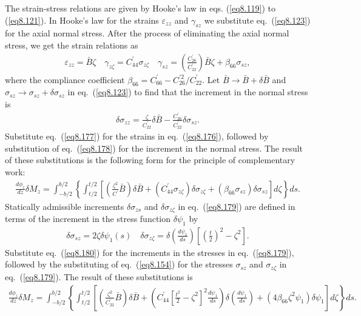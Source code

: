 \documentclass{AeroStructure-ERJohnson}
\begin{document}
\vspace*{-1pc}

The strain-stress relations are given by Hooke's law in eqs.
(\ref{eq8.119}) to (\ref{eq8.121}). In Hooke's law for the strains
$\varepsilon_{z z}$ and $\gamma_{s z}$ we substitute
eq.~(\ref{eq8.123}) for the axial normal stress. After the process
of eliminating the axial normal stress, we get the strain
relations as
\begin{align}\label{eq8.177}
\varepsilon_{z z}=\bar{B} \zeta \quad \gamma_{z \zeta}=C^{\prime}_{44} \sigma_{z \zeta} \quad \gamma_{s
z}=\left(\frac{C^{\prime}_{26}}{C^{\prime}_{22}}\right) \bar{B}
\zeta+\beta_{66} \sigma_{s z},
\end{align}
where the compliance coefficient
$\beta_{66}=C_{66}^{\prime}-C_{26}^{\prime 2}/ C_{22}^{\prime}$.
Let $\bar{B} \rightarrow \bar{B}+\delta \bar{B}$ and $\sigma_{s z}
\rightarrow \sigma_{s z}+\delta \sigma_{s z}$ in
eq.~(\ref{eq8.123}) to find that the increment in the normal
stress is
\begin{align}\label{eq8.178}
\delta \sigma_{z z}=\frac{\zeta}{C_{22}^{\prime}} \delta
\bar{B}-\frac{C_{26}^{\prime}}{C_{22}^{\prime}} \delta \sigma_{s
z}.
\end{align}
Substitute eq.~(\ref{eq8.177}) for the strains in
eq.~(\ref{eq8.176}), followed by substitution of
eq.~(\ref{eq8.178}) for the increment in the normal stress. The
result of these substitutions is the following form for the
principle of complementary work:
\begin{align}\label{eq8.179}
\frac{d \phi_{z}}{d z} \delta M_{z}=\int_{-b/ 2}^{b/
2}\left\{\int_{t/ 2}^{t/
2}\left[\left(\frac{\zeta^{2}}{C^{\prime}} \bar{B}\right) \delta
\bar{B}+\left(C^{\prime}_{44} \sigma_{z \zeta}\right) \delta
\sigma_{z \zeta}+\left(\beta_{66} \sigma_{s z}\right) \delta
\sigma_{s z}\right] d \zeta\right\} d s.
\end{align}
Statically admissible increments $\delta \sigma_{z s}$ and $\delta
\sigma_{z \zeta}$ in eq.~(\ref{eq8.179}) are defined in terms of
the increment in the stress function $\delta \psi_{1}$ by
\begin{align}\label{eq8.180}
\delta \sigma_{s z}=2 \zeta \delta \psi_{1}(s) \quad \delta
\sigma_{z \zeta}=\delta\left(\frac{d \psi_{1}}{d
s}\right)\left[\left(\frac{t}{2}\right)^{2}-\zeta^{2}\right].
\end{align}
Substitute eq.~(\ref{eq8.180}) for the increments in the stresses
in eq.~(\ref{eq8.179}), followed by the substituting of
eq.~(\ref{eq8.154}) for the stresses $\sigma_{s z}$ and $\sigma_{z
\zeta}$ in eq.~(\ref{eq8.179}). The result of these substitutions
is
\begin{align}\label{eq8.181}
\frac{d \phi_{z}}{d z} \delta M_{z}=\int_{-b/ 2}^{b/
2}\left\{\int_{t/ 2}^{t/
2}\left[\left(\frac{\zeta^{2}}{C_{22}^{\prime}} \bar{B}\right)
\delta
\bar{B}+\left(C_{44}^{\prime}\left[\frac{t^{2}}{2}-\zeta^{2}\right]^{2}
\frac{d \psi_{1}}{d s}\right) \delta\left(\frac{d \psi_{1}}{d
s}\right)+\left(4 \beta_{66} \zeta^{2} \psi_{1}\right) \delta
\psi_{1}\right] d \zeta\right\} d s.
\end{align}
\vspace*{2pt}
\clearpage
\end{document}
